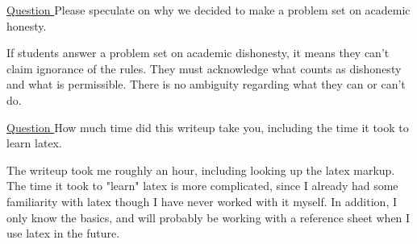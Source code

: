 \documentclass[a4paper]{article}
\begin{document}
\underline{Question }
Please speculate on why we decided to make a problem set on academic honesty.

If students answer a problem set on academic dishonesty, it means they can't claim ignorance of the rules. They must acknowledge what counts as dishonesty and what is permissible. There is no ambiguity regarding what they can or can't do.

\underline{Question }
How much time did this writeup take you, including the time it took to learn latex.

The writeup took me roughly an hour, including looking up the latex markup. The time it took to "learn" latex is more complicated, since I already had some familiarity with latex though I have never worked with it myself. In addition, I only know the basics, and will probably be working with a reference sheet when I use latex in the future.
\end{document}

